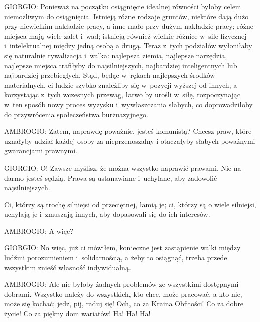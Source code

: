 \documentclass[oneside,polish,11pt,sfheadings]{mwbk}
\begin{document}
 
\noindent GIORGIO: Ponieważ na początku osiągnięcie idealnej równości byłoby celem niemożliwym do osiągnięcia. Istnieją różne
rodzaje gruntów, niektóre dają dużo przy niewielkim nakładzie pracy, a inne mało przy dużym nakładzie pracy; różne
miejsca mają wiele zalet i~wad; istnieją również wielkie różnice w~sile fizycznej i~intelektualnej między jedną osobą a
drugą. Teraz z~tych podziałów wyłoniłaby się naturalnie rywalizacja i~walka: najlepsza ziemia, najlepsze narzędzia,
najlepsze miejsca trafiłyby do najsilniejszych, najbardziej inteligentnych lub najbardziej przebiegłych. Stąd, będąc w~rękach najlepszych środków materialnych, ci ludzie szybko znaleźliby się w~pozycji wyższej od innych, a korzystając z~tych wczesnych przewag, łatwo by urośli w~siłę, rozpoczynając w~ten sposób nowy proces wyzysku i~wywłaszczania słabych,
co doprowadziłoby do przywrócenia społeczeństwa burżuazyjnego. 




 
\noindent AMBROGIO: Zatem, naprawdę poważnie, jesteś komunistą? Chcesz praw, które uznałyby udział każdej osoby za nieprzenoszalny
i otaczałyby słabych poważnymi gwarancjami prawnymi. 




 
\noindent GIORGIO: O! Zawsze myślisz, że można wszystko naprawić prawami. Nie na darmo jesteś sędzią. Prawa są ustanawiane i~uchylane, aby zadowolić najsilniejszych. 

 
Ci, którzy są trochę silniejsi od przeciętnej, łamią je; ci, którzy są o wiele silniejsi, uchylają je i~zmuszają innych,
aby dopasowali się do ich interesów. 




 
\noindent AMBROGIO: A więc? 




 
\noindent GIORGIO: No więc, już ci mówiłem, konieczne jest zastąpienie walki między ludźmi porozumieniem i~solidarnością, a żeby
to osiągnąć, trzeba przede wszystkim znieść własność indywidualną. 




 
\noindent AMBROGIO: Ale nie byłoby żadnych problemów ze wszystkimi dostępnymi dobrami. Wszystko należy do wszystkich, kto chce,
może pracować, a kto nie, może się kochać; jedz, pij, raduj się! Och, co za Kraina Obfitości! Co za dobre życie! Co za
piękny dom wariatów! Ha! Ha! Ha! 
\end{document}
